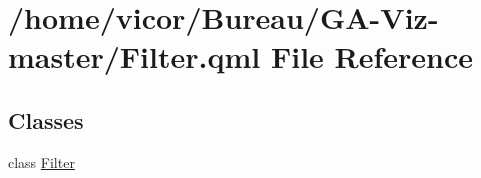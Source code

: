 \hypertarget{_filter_8qml}{}\section{/home/vicor/\+Bureau/\+G\+A-\/\+Viz-\/master/\+Filter.qml File Reference}
\label{_filter_8qml}
\subsection*{Classes}
\begin{DoxyCompactItemize}
\item 
class \hyperlink{class_filter}{Filter}
\end{DoxyCompactItemize}
